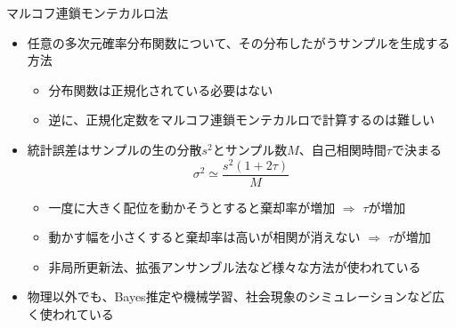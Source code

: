 
\begin{frame}[t,fragile]{マルコフ連鎖モンテカルロ法}
  \begin{itemize}
  \item 任意の多次元確率分布関数について、その分布したがうサンプルを生成する方法
    \begin{itemize}
    \item 分布関数は正規化されている必要はない
    \item 逆に、正規化定数をマルコフ連鎖モンテカルロで計算するのは難しい
    \end{itemize}
  \item 統計誤差はサンプルの生の分散$s^2$とサンプル数$M$、自己相関時間$\tau$で決まる
    \[
    \sigma^2 \simeq \frac{s^2 (1+2\tau)}{M}
    \]
    \begin{itemize}
    \item 一度に大きく配位を動かそうとすると棄却率が増加 $\Rightarrow$ $\tau$が増加
    \item 動かす幅を小さくすると棄却率は高いが相関が消えない $\Rightarrow$ $\tau$が増加
    \item 非局所更新法、拡張アンサンブル法など様々な方法が使われている
    \end{itemize}
  \item 物理以外でも、Bayes推定や機械学習、社会現象のシミュレーションなど広く使われている
  \end{itemize}
\end{frame}
